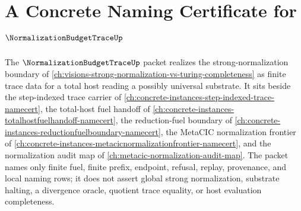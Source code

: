 \chapter{A Concrete Naming Certificate for $\NormalizationBudgetTraceUp$}
\label{ch:concrete-instances-normalization-budget-trace-namecert}

The $\NormalizationBudgetTraceUp$ packet realizes the strong-normalization boundary of \autoref{ch:visions-strong-normalization-vs-turing-completeness} as finite trace data for a total host reading a possibly universal substrate. It sits beside the step-indexed trace carrier of \autoref{ch:concrete-instances-step-indexed-trace-namecert}, the total-host fuel handoff of \autoref{ch:concrete-instances-totalhostfuelhandoff-namecert}, the reduction-fuel boundary of \autoref{ch:concrete-instances-reductionfuelboundary-namecert}, the MetaCIC normalization frontier of \autoref{ch:concrete-instances-metacicnormalizationfrontier-namecert}, and the normalization audit map of \autoref{ch:metacic-normalization-audit-map}. The packet names only finite fuel, finite prefix, endpoint, refusal, replay, provenance, and local naming rows; it does not assert global strong normalization, substrate halting, a divergence oracle, quotient trace equality, or host evaluation completeness.


